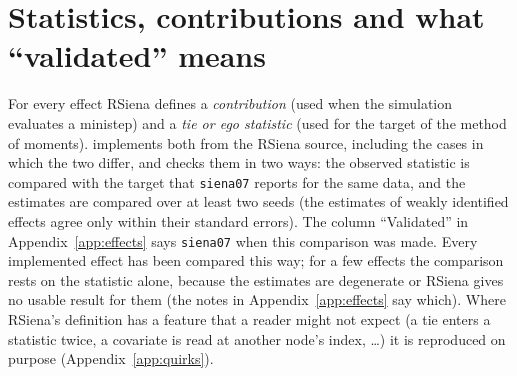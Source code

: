 \section{Statistics, contributions and what ``validated'' means}
For every effect RSiena defines a \emph{contribution} (used when the simulation evaluates a ministep) and a \emph{tie or ego statistic} (used for the target of the method of moments). \nwsaom{} implements both from the RSiena source, including the cases in which the two differ, and checks them in two ways: the observed statistic is compared with the target that \texttt{siena07} reports for the same data, and the estimates are compared over at least two seeds (the estimates of weakly identified effects agree only within their standard errors). The column ``Validated'' in Appendix~\ref{app:effects} says \texttt{siena07} when this comparison was made. Every implemented effect has been compared this way; for a few effects the comparison rests on the statistic alone, because the estimates are degenerate or RSiena gives no usable result for them (the notes in Appendix~\ref{app:effects} say which). Where RSiena's definition has a feature that a reader might not expect (a tie enters a statistic twice, a covariate is read at another node's index, \ldots) it is reproduced on purpose (Appendix~\ref{app:quirks}).

